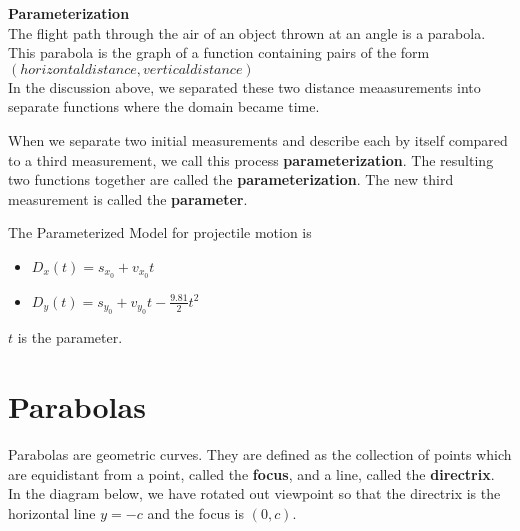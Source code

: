 \documentclass{ximera}
\begin{document}
\begin{definition} \textbf{\textcolor{green!50!black}{Parameterization}} \\

The flight path through the air of an object thrown at an angle is a parabola.  This parabola is the graph of a function containing pairs of the form $(horizontal distance, vertical distance)$ \\

In the discussion above, we separated these two distance meaasurements into separate functions where the domain became time.



When we separate two initial measurements and describe each by itself compared to a third measurement, we call this process \textbf{parameterization}.  The resulting two functions together are called the \textbf{parameterization}.  The new third measurement is called the \textbf{parameter}.





\begin{model} 


The Parameterized Model for projectile motion is


\begin{itemize}
\item $D_x(t) = s_{x_0} + v_{x_0} t$
\item $D_y(t) = s_{y_0} + v_{y_0} t - \frac{9.81}{2} t^2$
\end{itemize}

$t$ is the parameter.

\end{model}



\end{definition}

















\section{Parabolas}

Parabolas are geometric curves.  They are defined as the collection of points which are equidistant from a point, called the \textbf{focus}, and a line, called the \textbf{directrix}.  In the diagram below,  we have rotated out viewpoint so that the directrix is the horizontal line $y = -c$ and the focus is $(0,c)$.
\end{document}

